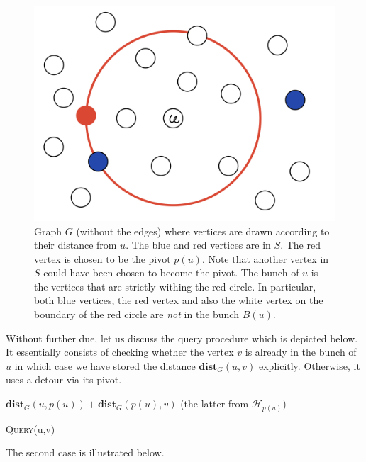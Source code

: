\begin{figure}[!ht]
    \centering
    \includegraphics[scale=0.2]{./fig/lecture_DistanceOracles_Bunch.jpeg}
    \caption{Graph $G$ (without the edges) where vertices are drawn according to their distance from $u$. The blue and red vertices are in $S$. The red vertex is chosen to be the pivot $p(u)$. Note that another vertex in $S$ could have been chosen to become the pivot. The bunch of $u$ is the vertices that are strictly withing the red circle. In particular, both blue vertices, the red vertex and also the white vertex on the boundary of the red circle are \emph{not} in the bunch $B(u)$.}
\end{figure}

Without further due, let us discuss the query procedure which is depicted below. It essentially consists of checking whether the vertex $v$ is already in the bunch of $u$ in which case we have stored the distance $\mathbf{dist}_G(u,v)$ explicitly. Otherwise, it uses a detour via its pivot.

\begin{algorithm}
  \SetAlgoLined
  \Return $\mathbf{dist}_G(u,p(u)) + \mathbf{dist}_G(p(u),v)$ (the latter from $\mathcal{H}_{p(u)}$)
  \caption{\textsc{Query}(u,v)}
\end{algorithm}

The second case is illustrated below.

